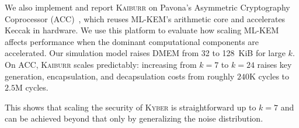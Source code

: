 \documentclass[journal=tches,preprint,floatrow]{iacrtrans}
\begin{document}
We also implement and report \textsc{Kaiburr} on Pavona's Asymmetric
Cryptography Coprocessor (ACC)~\cite{pavona}, which reuses ML-KEM's
arithmetic core and accelerates Keccak in hardware. We use this platform to
evaluate how scaling ML-KEM affects performance when the dominant
computational components are accelerated. Our simulation model raises
DMEM from 32 to 128~KiB for large $k$. On ACC, \textsc{Kaiburr} scales
predictably: increasing from $k=7$ to $k=24$ raises
key generation, encapsulation, and decapsulation costs from roughly $240$K
cycles to $2.5$M cycles.

This shows that scaling the security of \textsc{Kyber} is straightforward up to $k=7$ and can be achieved beyond that only by generalizing the noise distribution.

{\footnotesize


}
\end{document}
